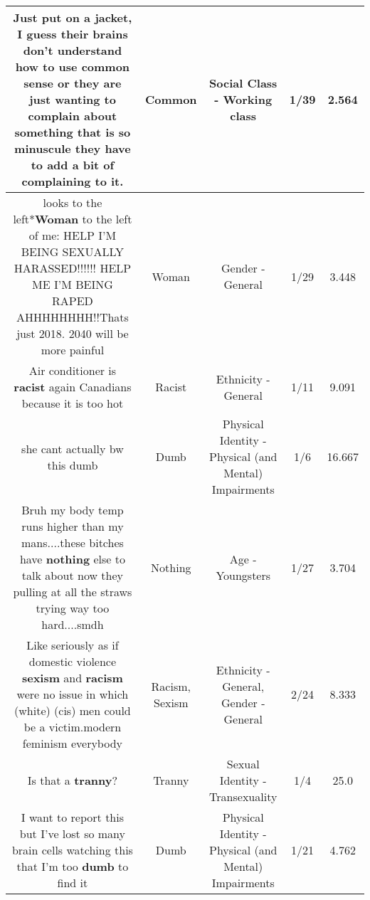 \documentclass[11pt]{article}
\newlength\mylength
\begin{document}
\begin{center}
\begin{longtable}{|C{.65\mylength}|C{.30\mylength}|C{.12\mylength}|C{.12\mylength}|C{.12\mylength}|}
  \small Just put on a jacket, I guess their brains don't understand how to use \textbf{common} sense or they are just wanting to complain about something that is so minuscule they have to add a bit of complaining to it.\normalsize   & Common & Social Class - Working class & 1/39 & 2.564 \\  \hline
  \small *looks to the left*\textbf{Woman} to the left of me: HELP I'M BEING SEXUALLY HARASSED!!!!!! HELP ME I'M BEING RAPED AHHHHHHHH!!Thats just 2018. 2040 will be more painful\normalsize   & Woman & Gender - General & 1/29 & 3.448 \\  \hline
  \small Air conditioner is \textbf{racist} again Canadians because it is too hot\normalsize   & Racist & Ethnicity - General & 1/11 & 9.091 \\  \hline
  \small she cant actually bw this dumb\normalsize   & Dumb & Physical Identity - Physical (and Mental) Impairments & 1/6 & 16.667 \\  \hline
  \small Bruh my body temp runs higher than my mans....these bitches have \textbf{nothing} else to talk about now they pulling at all the straws trying way too hard....smdh\normalsize   & Nothing & Age - Youngsters & 1/27 & 3.704 \\  \hline
  \small Like seriously as if domestic violence \textbf{sexism} and \textbf{racism} were no issue in which (white) (cis) men could be a victim.modern feminism everybody\normalsize   & Racism, Sexism & Ethnicity - General, Gender - General & 2/24 & 8.333 \\  \hline
  \small Is that a \textbf{tranny}?\normalsize   & Tranny & Sexual Identity - Transexuality & 1/4 & 25.0 \\  \hline
  \small I want to report this but I've lost so many brain cells watching this that I'm too \textbf{dumb} to find it\normalsize   & Dumb & Physical Identity - Physical (and Mental) Impairments & 1/21 & 4.762 \\  \hline

\end{longtable}
\end{center}
\end{document}

